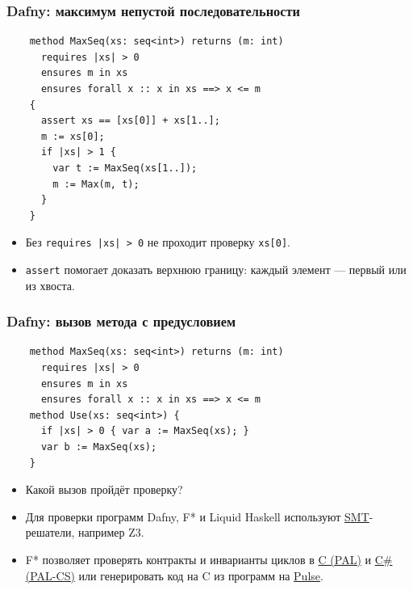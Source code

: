 \documentclass[11pt]{beamer}
\begin{document}
\begin{frame}[fragile]
  \frametitle{Dafny: максимум непустой последовательности}
  \small
  \begin{lstlisting}
    method MaxSeq(xs: seq<int>) returns (m: int)
      requires |xs| > 0
      ensures m in xs
      ensures forall x :: x in xs ==> x <= m
    {
      assert xs == [xs[0]] + xs[1..];
      m := xs[0];
      if |xs| > 1 {
        var t := MaxSeq(xs[1..]);
        m := Max(m, t);
      }
    }
  \end{lstlisting}
  \begin{itemize}
    \setlength{\itemsep}{0pt}
    \item<2-> Без \lstinline!requires |xs| > 0! не проходит проверку \texttt{xs[0]}.
    \item<3-> \lstinline!assert! помогает доказать верхнюю границу: каждый элемент — первый или из хвоста.
  \end{itemize}
\end{frame}

\begin{frame}[fragile]
  \frametitle{Dafny: вызов метода с предусловием}
  \small
  \begin{lstlisting}
    method MaxSeq(xs: seq<int>) returns (m: int)
      requires |xs| > 0
      ensures m in xs
      ensures forall x :: x in xs ==> x <= m
    method Use(xs: seq<int>) {
      if |xs| > 0 { var a := MaxSeq(xs); }
      var b := MaxSeq(xs);
    }
  \end{lstlisting}
  \begin{itemize}
    \setlength{\itemsep}{0pt}
    \item Какой вызов пройдёт проверку? 
    \item<2-> Для проверки программ Dafny, F* и Liquid Haskell используют \href{https://en.wikipedia.org/wiki/Satisfiability_modulo_theories}{SMT}-решатели, например Z3.
    \item<2-> F* позволяет проверять контракты и инварианты циклов в \href{https://fstar-lang.org/\#pal}{C (PAL)} и \href{https://fstar-lang.org/\#pal-cs}{C\# (PAL-CS)} или генерировать код на C из программ на \href{https://fstar-lang.org/\#pulse}{Pulse}.
  \end{itemize}
\end{frame}
\end{document}
